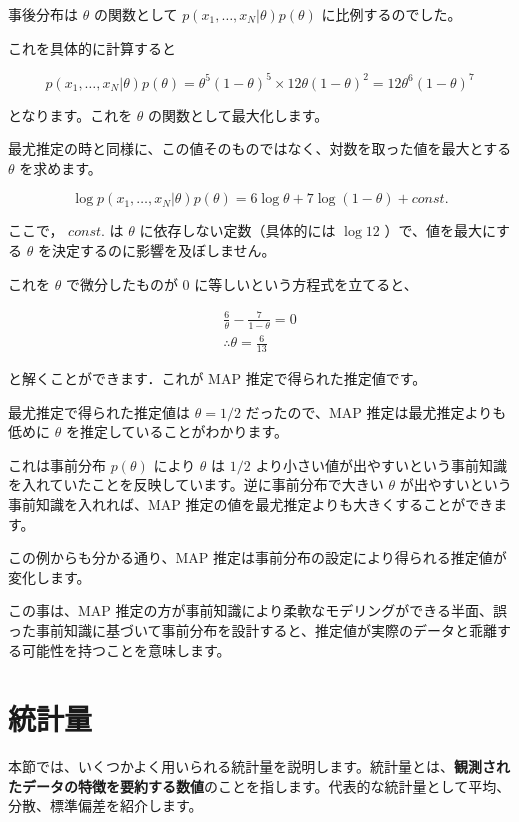 事後分布は $\theta$ の関数として $p(x_1, \ldots, x_N | \theta) p(\theta)$ に比例するのでした。

これを具体的に計算すると


\[
p(x_1, \ldots, x_N | \theta) p(\theta) = \theta^5 (1-\theta)^5 \times 12 \theta (1-\theta)^2 = 12 \theta^6 (1-\theta)^7
\]


となります。これを $\theta$ の関数として最大化します。

最尤推定の時と同様に、この値そのものではなく、対数を取った値を最大とする $\theta$ を求めます。


\[
\log p(x_1, \ldots, x_N | \theta) p(\theta) = 6\log \theta + 7 \log (1-\theta) + const.
\]


ここで， $const.$ は $\theta$ に依存しない定数（具体的には $\log 12$ ）で、値を最大にする $\theta$ を決定するのに影響を及ぼしません。

これを $\theta$ で微分したものが $0$ に等しいという方程式を立てると、


\begin{align}
\frac{6}{\theta} - \frac{7}{1-\theta} = 0 \\
\therefore \theta = \frac{6}{13}
\end{align}


と解くことができます．これが MAP 推定で得られた推定値です。


最尤推定で得られた推定値は $\theta = 1/2$ だったので、MAP 推定は最尤推定よりも低めに $\theta$ を推定していることがわかります。

これは事前分布 $p(\theta)$ により $\theta$ は $1/2$ より小さい値が出やすいという事前知識を入れていたことを反映しています。逆に事前分布で大きい $\theta$ が出やすいという事前知識を入れれば、MAP 推定の値を最尤推定よりも大きくすることができます。


この例からも分かる通り、MAP 推定は事前分布の設定により得られる推定値が変化します。

この事は、MAP 推定の方が事前知識により柔軟なモデリングができる半面、誤った事前知識に基づいて事前分布を設計すると、推定値が実際のデータと乖離する可能性を持つことを意味します。


\section{統計量}


本節では、いくつかよく用いられる統計量を説明します。統計量とは、\textbf{観測されたデータの特徴を要約する数値}のことを指します。代表的な統計量として平均、分散、標準偏差を紹介します。


